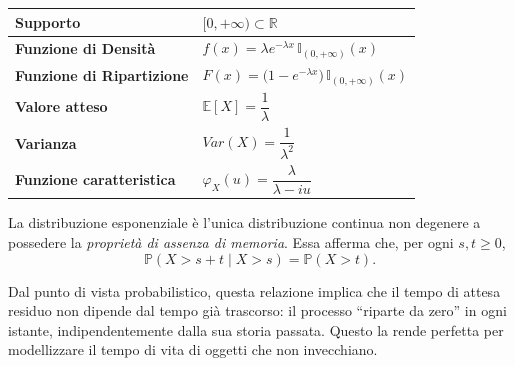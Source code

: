 \bigskip
\begin{table}[H]
\centering
\renewcommand{\arraystretch}{2}
\begin{tabular}{@{}ll@{}}
\toprule
\textbf{Supporto} 
& $[0,+\infty)\subset\mathbb{R}$ \\

\midrule

\textbf{Funzione di Densità} 
& $f(x)=\lambda e^{-\lambda x}\,\mathbb{I}_{(0, +\infty)}(x)$\\

\midrule

\textbf{Funzione di Ripartizione}
& $F(x)=\bigl(1-e^{-\lambda x}\bigl)\,\mathbb{I}_{(0, +\infty)}(x)$ \\

\midrule

\textbf{Valore atteso} 
& $\mathbb{E}[X]=\dfrac{1}{\lambda}$ \\

\midrule

\textbf{Varianza}
& $Var(X)=\dfrac{1}{\lambda^2}$ \\

\midrule

\textbf{Funzione caratteristica}
& $\varphi_X(u)=\dfrac{\lambda}{\lambda-iu}$ \\

\bottomrule
\end{tabular}
\end{table}

\noindent La distribuzione esponenziale è l’unica distribuzione continua non degenere a possedere la \emph{proprietà di assenza di memoria}. 
Essa afferma che, per ogni $s,t \ge 0$,
\[
\mathbb{P}(X > s+t \mid X > s) = \mathbb{P}(X > t).
\]

Dal punto di vista probabilistico, questa relazione implica che il tempo di attesa residuo non dipende dal tempo già trascorso: il processo “riparte da zero” in ogni istante, indipendentemente dalla sua storia passata. Questo la rende perfetta per modellizzare il tempo di vita di oggetti che non
invecchiano.
